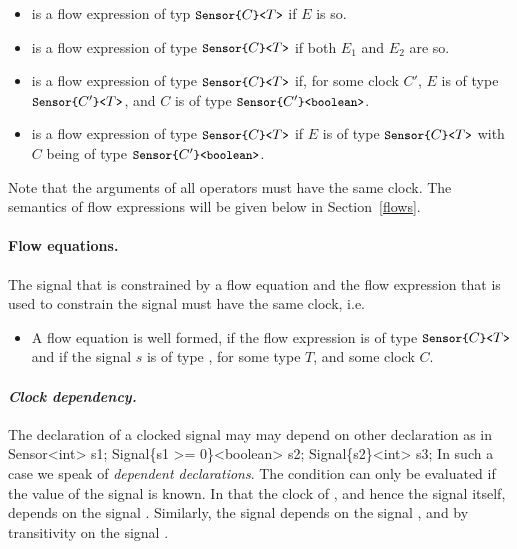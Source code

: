 {\begin{itemize}
\begin{itemize}
\begin{itemize}
			 \item the flow expressions  are
			 of type $\pp{Sensor\{}C\pp{\}<}T_{i}\pp{>}$
		\end{itemize}
    \end{itemize}
    
    \item \emph{} is a flow expression of typ 
    $\texttt{\small{Sensor\{}}C\texttt{\small{\}<}}T\texttt{\small{>}}$ 
    if $E$ is so.

    \item {} is a flow expression of type
    $\texttt{\small{Sensor\{}}C\texttt{\small{\}<}}T\texttt{\small{>}}$ if both $E_{1}$ and $E_{2}$ are so.

    \item \emph{} is a flow expression of type
    $\texttt{\small{Sensor\{}}C\texttt{\small{\}<}}T\texttt{\small{>}}$ if, for some clock $C'$, $E$ is of type 
    $\texttt{\small{Sensor\{}}C'\texttt{\small{\}<}}T\texttt{\small{>}}$,
     and $C$ is of type $\texttt{\small{Sensor\{}}C'\texttt{\small{\}<boolean>}}$.

    \item \emph{} is a flow expression of type
    $\texttt{\small{Sensor\{}}C\texttt{\small{\}<}}T\texttt{\small{>}}$ if $E$ is of type
     $\texttt{\small{Sensor\{}}C\texttt{\small{\}<}}T\texttt{\small{>}}$ with $C$ being of type
    $\texttt{\small{Sensor\{}}C'\texttt{\small{\}<boolean>}}$.

\end{itemize}
Note that the arguments of all operators must have 
the same clock. The semantics of flow expressions will be given below in Section~\ref{flows}.

\paragraph{Flow equations.} The signal that is constrained by a flow 
equation and the flow expression that is used to constrain the signal must
 have the same clock, i.e.
\begin{itemize}
\item A flow equation \emph{} is well formed, if the flow expression is of type $\texttt{\small{Sensor\{}}C\texttt{\small{\}<}}T\texttt{\small{>}}$
and if the signal $s$ is of
type \emph{},
for some type $T$, and some clock $C$.
\end{itemize}

\paragraph{\textit{Clock dependency.}} The declaration of a clocked signal may 
may depend on other declaration as in
%
\BEP
Sensor<int>            s1;
Signal\{s1 >= 0\}<boolean> s2;
Signal\{s2\}<int>          s3;
\EEP
%
In such a case we speak of \emph{dependent declarations}.
The condition  can only be evaluated if the value of the signal  is known. In that the clock of , 
and hence the signal itself, depends on the 
signal . Similarly, the signal  depends on the signal , and by transitivity
on the signal .

}

